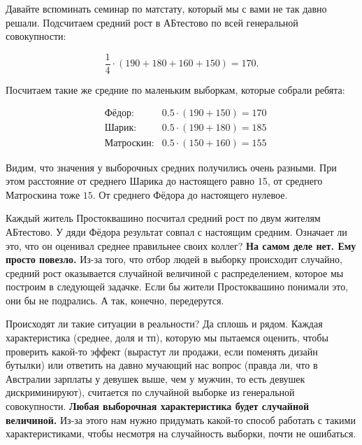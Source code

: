 \documentclass[12pt, a4paper, oneside]{article}
\theoremstyle{plain} %
\theoremstyle{definition}
\newcommand{\indef}[1]{\textbf{ \color{green} #1}}
\begin{document}
\begin{solution}
Давайте вспоминать семинар по матстату, который мы с вами не так давно решали. Подсчитаем средний рост в АБтестово  по всей генеральной совокупности: 

\[
\frac{1}{4} \cdot (190 + 180 + 160 + 150) = 170.
\]

Посчитаем такие же средние по маленьким выборкам, которые собрали ребята: 

\begin{equation*} 
\begin{aligned} 
& \text{Фёдор:}  & 0.5 \cdot (190 + 150) = 170 \\
& \text{Шарик:}  & 0.5 \cdot (190 + 180) = 185 \\
& \text{Матроскин:} & 0.5 \cdot (150 + 160) = 155 
\end{aligned}
\end{equation*}

Видим, что значения у выборочных средних получились очень разными. При этом расстояние от среднего Шарика до настоящего равно $15$, от среднего Матроскина тоже $15$. От среднего Фёдора до настоящего нулевое. 

Каждый житель Простоквашино посчитал средний рост по двум жителям АБтестово. У дяди Фёдора результат совпал с настоящим средним. Означает ли это, что он оценивал среднее правильнее своих коллег?  \indef{На самом деле нет. Ему просто повезло.}  Из-за того, что отбор людей в выборку происходит случайно, средний рост оказывается случайной величиной с распределением, которое мы построим в следующей задачке. Если бы жители Простоквашино понимали это, они бы не подрались. А так, конечно, передерутся. 

Происходят ли такие ситуации в реальности? Да сплошь и рядом. Каждая характеристика (среднее, доля и тп), которую мы пытаемся оценить, чтобы проверить какой-то эффект (вырастут ли продажи, если поменять дизайн бутылки) или ответить на давно мучающий нас вопрос (правда ли, что в Австралии зарплаты у девушек выше, чем у мужчин, то есть девушек дискриминируют), считается по случайной выборке из генеральной совокупности. \indef{Любая выборочная характеристика будет случайной величиной.} Из-за этого нам нужно придумать какой-то способ работать с такими характеристиками, чтобы несмотря на случайность выборки, почти не ошибаться. 
\end{solution}
\end{document}
